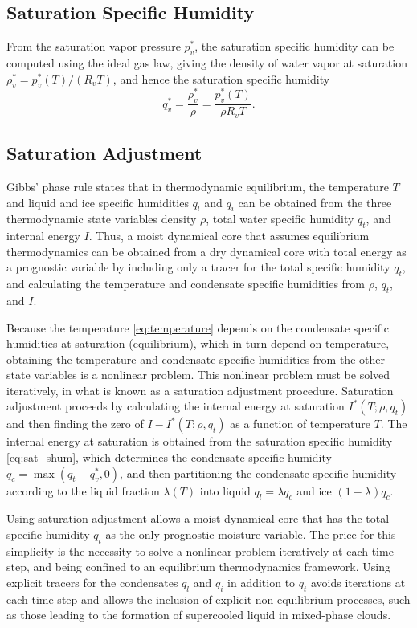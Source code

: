 \documentclass{article}
\begin{document}
\subsection{Saturation Specific Humidity}

From the saturation vapor pressure $p_v^*$, the saturation specific humidity can be computed using the ideal gas law, giving the density of water vapor at saturation $\rho_v^* = p_v^*(T)/(R_v T)$, and hence the saturation specific humidity 
\begin{equation}\label{eq:sat_shum}
     q_v^* = \frac{\rho_v^*}{\rho} = \frac{p_v^*(T)}{\rho R_v T}.
\end{equation}

\subsection{Saturation Adjustment}

Gibbs' phase rule states that in thermodynamic equilibrium, the temperature $T$ and liquid and ice specific humidities $q_l$ and $q_i$ can be obtained from the three thermodynamic state variables density $\rho$, total water specific humidity $q_t$, and internal energy $I$. Thus, a moist dynamical core that assumes equilibrium thermodynamics can be obtained from a dry dynamical core with total energy as a prognostic variable by including only a tracer for the total specific humidity $q_t$, and calculating the temperature and condensate specific humidities from $\rho$, $q_t$, and $I$. 

Because the temperature \eqref{eq:temperature} depends on the condensate specific humidities at saturation (equilibrium), which in turn depend on temperature, obtaining the temperature and condensate specific humidities from the other state variables is a nonlinear problem. This nonlinear problem must be solved iteratively, in what is known as a saturation adjustment procedure. Saturation adjustment proceeds by calculating the internal energy at saturation $I^*(T; \rho, q_t)$ and then finding the zero of $I-I^*(T; \rho, q_t)$ as a function of temperature $T$. The internal energy at saturation is obtained from the saturation specific humidity \eqref{eq:sat_shum}, which determines the condensate specific humidity $q_c = \max(q_t - q_v^*, 0)$, and then partitioning the condensate specific humidity according to the liquid fraction $\lambda(T)$ into liquid $q_l = \lambda q_c$ and ice $(1-\lambda)q_c$. 

Using saturation adjustment allows a moist dynamical core that has the total specific humidity $q_t$ as the only prognostic moisture variable. The price for this simplicity is the necessity to solve a nonlinear problem iteratively at each time step, and being confined to an equilibrium thermodynamics framework. Using explicit tracers for the condensates $q_l$ and $q_i$ in addition to $q_t$ avoids iterations at each time step and allows the inclusion of explicit non-equilibrium processes, such as those leading to the formation of supercooled liquid in mixed-phase clouds. 
\end{document}
